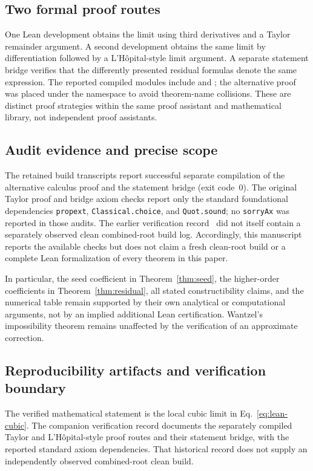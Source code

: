 \documentclass[11pt]{article}
\theoremstyle{remark}
\begin{document}
\subsection{Two formal proof routes}
One Lean development obtains the limit using third derivatives and a
Taylor remainder argument.  A second development obtains the same limit
by differentiation followed by a L'H\^opital-style limit argument.
A separate statement bridge verifies that the differently presented
residual formulas denote the same expression.  The reported compiled
modules include  and
; the alternative proof was placed
under the namespace  to avoid theorem-name
collisions.  These are distinct proof strategies within the same proof
assistant and mathematical library, not independent proof assistants.

\subsection{Audit evidence and precise scope}
The retained build transcripts report successful separate compilation
of the alternative calculus proof and the statement bridge (exit code~0).
The original Taylor proof and bridge axiom checks report only the
standard foundational dependencies
\texttt{propext}, \texttt{Classical.choice}, and \texttt{Quot.sound};
no \texttt{sorryAx} was reported in those audits.  The earlier verification
record~\cite{BakerLeanRecord2026} did not itself contain a separately
observed clean combined-root build log.  Accordingly, this manuscript
reports the available checks but does not claim a fresh clean-root build
or a complete Lean formalization of every theorem in this paper.

In particular, the seed coefficient in Theorem~\ref{thm:seed}, the
higher-order coefficients in Theorem~\ref{thm:residual}, all stated
constructibility claims, and the numerical table remain supported by
their own analytical or computational arguments, not by an implied
additional Lean certification.  Wantzel's impossibility theorem remains
unaffected by the verification of an approximate correction.

\subsection{Reproducibility artifacts and verification boundary}
The verified mathematical statement is the local cubic limit in
Eq.~\eqref{eq:lean-cubic}. The companion verification record
\cite{BakerLeanRecord2026} documents the separately compiled Taylor and
L'H\^opital-style proof routes and their statement bridge, with the
reported standard axiom dependencies. That historical record does not
supply an independently observed combined-root clean build.
\end{document}
